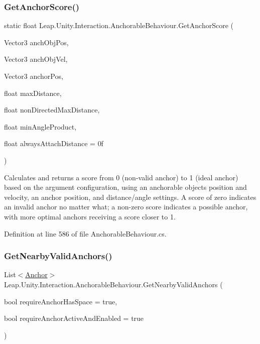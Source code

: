 \subsubsection{\texorpdfstring{GetAnchorScore()}{GetAnchorScore()}}
{\footnotesize\ttfamily static float Leap.\+Unity.\+Interaction.\+Anchorable\+Behaviour.\+Get\+Anchor\+Score (\begin{DoxyParamCaption}\item[{Vector3}]{anch\+Obj\+Pos,  }\item[{Vector3}]{anch\+Obj\+Vel,  }\item[{Vector3}]{anchor\+Pos,  }\item[{float}]{max\+Distance,  }\item[{float}]{non\+Directed\+Max\+Distance,  }\item[{float}]{min\+Angle\+Product,  }\item[{float}]{always\+Attach\+Distance = {\ttfamily 0f} }\end{DoxyParamCaption})\hspace{0.3cm}{\ttfamily [static]}}



Calculates and returns a score from 0 (non-\/valid anchor) to 1 (ideal anchor) based on the argument configuration, using an anchorable object\textquotesingle{}s position and velocity, an anchor position, and distance/angle settings. A score of zero indicates an invalid anchor no matter what; a non-\/zero score indicates a possible anchor, with more optimal anchors receiving a score closer to 1. 



Definition at line 586 of file Anchorable\+Behaviour.\+cs.

\mbox{\label{class_leap_1_1_unity_1_1_interaction_1_1_anchorable_behaviour_a5a5c9e551804405da221dd9bdc3b9e42}} 
\subsubsection{\texorpdfstring{GetNearbyValidAnchors()}{GetNearbyValidAnchors()}}
{\footnotesize\ttfamily List$<$\mbox{\hyperlink{class_leap_1_1_unity_1_1_interaction_1_1_anchor}{Anchor}}$>$ Leap.\+Unity.\+Interaction.\+Anchorable\+Behaviour.\+Get\+Nearby\+Valid\+Anchors (\begin{DoxyParamCaption}\item[{bool}]{require\+Anchor\+Has\+Space = {\ttfamily true},  }\item[{bool}]{require\+Anchor\+Active\+And\+Enabled = {\ttfamily true} }\end{DoxyParamCaption})}



